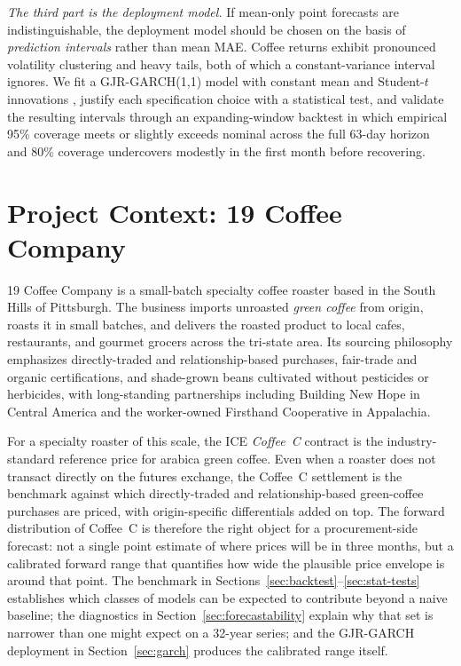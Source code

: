 \documentclass[conference]{IEEEtran}
\begin{document}
\emph{The third part is the deployment model.} If mean-only point
forecasts are indistinguishable, the deployment model should be
chosen on the basis of \emph{prediction intervals} rather than mean
MAE. Coffee returns exhibit pronounced volatility clustering and
heavy tails, both of which a constant-variance interval ignores. We
fit a GJR-GARCH(1{,}1) model with constant mean and Student-$t$
innovations \cite{bollerslev1986generalized,glosten1993relation},
justify each specification choice with a statistical test, and
validate the resulting intervals through an expanding-window
backtest in which empirical 95\% coverage meets or slightly exceeds
nominal across the full 63-day horizon and 80\% coverage undercovers
modestly in the first month before recovering.

\section{Project Context: 19 Coffee Company}
\label{sec:client}

19 Coffee Company is a small-batch specialty coffee roaster based in
the South Hills of Pittsburgh. The business imports unroasted
\emph{green coffee} from origin, roasts it in small batches, and
delivers the roasted product to local cafes, restaurants, and
gourmet grocers across the tri-state area. Its sourcing philosophy
emphasizes directly-traded and relationship-based purchases,
fair-trade and organic certifications, and shade-grown beans
cultivated without pesticides or herbicides, with long-standing
partnerships including Building New Hope in Central America and the
worker-owned Firsthand Cooperative in Appalachia.

For a specialty roaster of this scale, the ICE \emph{Coffee~C}
contract is the industry-standard reference price for arabica green
coffee. Even when a roaster does not transact directly on the
futures exchange, the Coffee~C settlement is the benchmark against
which directly-traded and relationship-based green-coffee purchases
are priced, with origin-specific differentials added on top. The
forward distribution of Coffee~C is therefore the right object for
a procurement-side forecast: not a single point estimate of where
prices will be in three months, but a calibrated forward range that
quantifies how wide the plausible price envelope is around that
point. The benchmark in
Sections~\ref{sec:backtest}--\ref{sec:stat-tests} establishes which
classes of models can be expected to contribute beyond a naive
baseline; the diagnostics in Section~\ref{sec:forecastability}
explain why that set is narrower than one might expect on a 32-year
series; and the GJR-GARCH deployment in Section~\ref{sec:garch}
produces the calibrated range itself.
\end{document}
